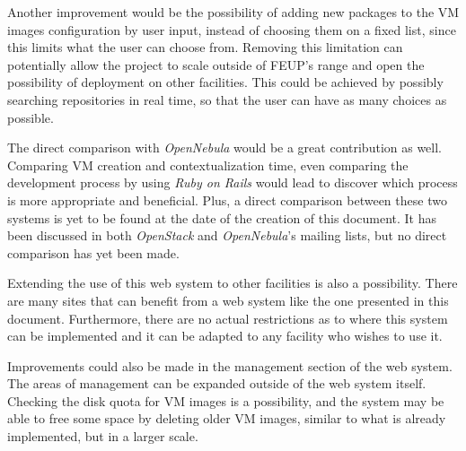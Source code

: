 Another improvement would be the possibility of adding new packages to the VM images configuration by user input, instead of choosing them on a fixed list, since this limits what the user can choose from. Removing this limitation can potentially allow the project to scale outside of FEUP's range and open the possibility of deployment on other facilities. This could be achieved by possibly searching repositories in real time, so that the user can have as many choices as possible.

The direct comparison with \textit{OpenNebula} would be a great contribution as well. Comparing VM creation and contextualization time, even comparing the development process by using \textit{Ruby on Rails} would lead to discover which process is more appropriate and beneficial.
Plus, a direct comparison between these two systems is yet to be found at the date of the creation of this document. It has been discussed in both \textit{OpenStack} and \textit{OpenNebula}'s mailing lists, but no direct comparison has yet been made.

Extending the use of this web system to other facilities is also a possibility. There are many sites that can benefit from a web system like the one presented in this document. Furthermore, there are no actual restrictions as to where this system can be implemented and it can be adapted to any facility who wishes to use it.

Improvements could also be made in the management section of the web system. The areas of management can be expanded outside of the web system itself. Checking the disk quota for VM images is a possibility, and the system may be able to free some space by deleting older VM images, similar to what is already implemented, but in a larger scale.

